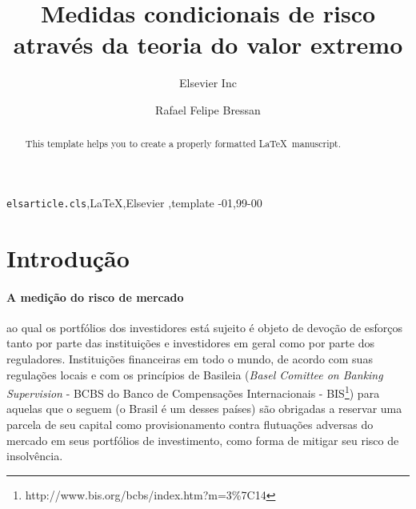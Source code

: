 \documentclass[review]{elsarticle}
\theoremstyle{definition}
\begin{document}
\begin{frontmatter}

\title{Medidas condicionais de risco através da teoria do valor extremo}


\author[mymainaddress,mysecondaryaddress]{Elsevier Inc}

\author[mymainaddress]{Rafael Felipe Bressan}

\address[mymainaddress]{Avenida Madre Benvenuta, 2007 - Santa Mônica Florianópolis - SC 88035-901}
\address[mysecondaryaddress]{360 Park Avenue South, New York}

\begin{abstract}
This template helps you to create a properly formatted \LaTeX\ manuscript.
\end{abstract}

\begin{keyword}
\texttt{elsarticle.cls}\sep \LaTeX\sep Elsevier \sep template
-01\sep  99-00
\end{keyword}

\end{frontmatter}

\linenumbers

\section{Introdução}

\paragraph{A medição do risco de mercado} ao qual os portfólios dos investidores está sujeito é objeto de devoção de esforços tanto por parte das instituições e investidores em geral como por parte dos reguladores. Instituições financeiras em todo o mundo, de acordo com suas regulações locais e com os princípios de Basileia (\emph{Basel Comittee on Banking Supervision} - BCBS do Banco de Compensações Internacionais - BIS\footnote{http://www.bis.org/bcbs/index.htm?m=3\%7C14}) para aquelas que o seguem (o Brasil é um desses países)  são obrigadas a reservar uma parcela de seu capital como provisionamento contra flutuações adversas do mercado em seus portfólios de investimento, como forma de mitigar seu risco de insolvência.
\end{document}
